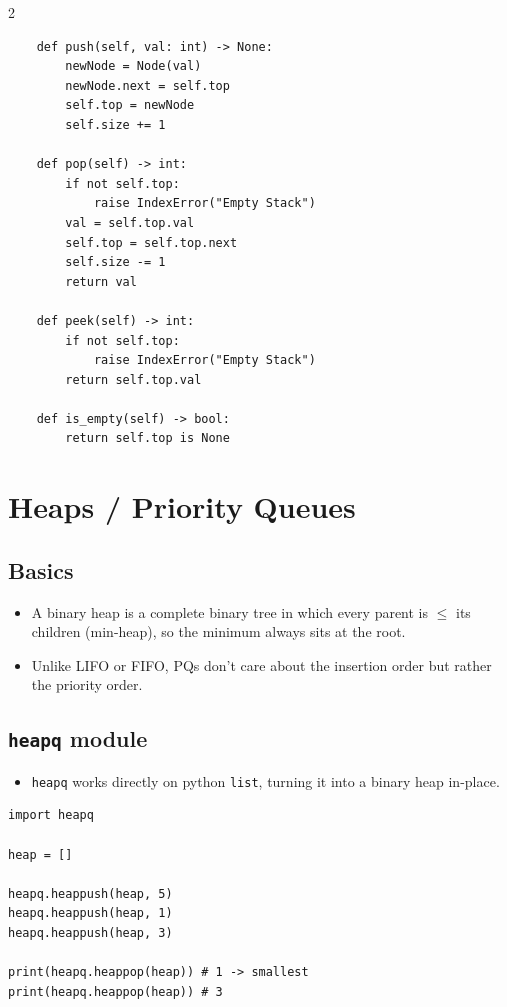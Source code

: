 \documentclass[9pt,a4paper]{extarticle}
\begin{document}
\begin{multicols}{2}
\begin{lstlisting}
    def push(self, val: int) -> None:
        newNode = Node(val)
        newNode.next = self.top
        self.top = newNode
        self.size += 1

    def pop(self) -> int:
        if not self.top:
            raise IndexError("Empty Stack")
        val = self.top.val
        self.top = self.top.next
        self.size -= 1
        return val

    def peek(self) -> int:
        if not self.top:
            raise IndexError("Empty Stack")
        return self.top.val

    def is_empty(self) -> bool:
        return self.top is None
\end{lstlisting}

\section{Heaps / Priority Queues}

\subsection{Basics}

\begin{itemize}
\item A binary heap is a complete binary tree in which every parent is $\le$ its children (min-heap), so the minimum always sits at the root.
\item Unlike LIFO or FIFO, PQs don't care about the insertion order but rather the priority order.
\end{itemize}

\subsection{\texorpdfstring{\texttt{heapq}}{heapq} module}

\begin{itemize}
\item \texttt{heapq} works directly on python \texttt{list}, turning it into a binary heap in-place.
\end{itemize}

\begin{lstlisting}
import heapq

heap = []

heapq.heappush(heap, 5)
heapq.heappush(heap, 1)
heapq.heappush(heap, 3)

print(heapq.heappop(heap)) # 1 -> smallest
print(heapq.heappop(heap)) # 3
\end{lstlisting}


\end{multicols}
\end{document}
